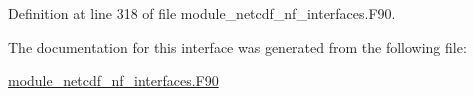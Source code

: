 Definition at line 318 of file module\+\_\+netcdf\+\_\+nf\+\_\+interfaces.\+F90.



The documentation for this interface was generated from the following file\+:\begin{DoxyCompactItemize}
\item 
\hyperlink{module__netcdf__nf__interfaces_8F90}{module\+\_\+netcdf\+\_\+nf\+\_\+interfaces.\+F90}\end{DoxyCompactItemize}
